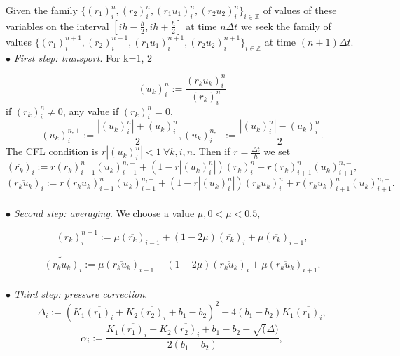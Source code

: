 \documentclass[a4paper,12pt]{article}
\begin{document}
Given the family $\{(r_1)_i^n,(r_2)_i^n,(r_1u_1)_i^n,(r_2u_2)_i^n\}_{i\in\mathbb{Z}}$ of values of these variables on the interval $[ih-\frac{h}{2},ih+\frac{h}{2}]$ at time $n\Delta t$ we seek the family   of values $\{(r_1)_i^{n+1},(r_2)_i^{n+1},(r_1u_1)_i^{n+1},(r_2u_2)_i^{n+1}\}_{i\in\mathbb{Z}}$ at time $(n+1)\Delta t$.\\



$\bullet$ \textit{First step: transport}. For k=1, 2
  
\begin{equation}(u_k)_i^n:=\frac{(r_ku_k)_i^n}{(r_k)_i^n} \end{equation}  if  $ (r_k)_i^n\not=0$, any value if  $(r_k)_i^n=0,$
\begin{equation} (u_k)_i^{n,+}:=\frac{|(u_k)_i^n|+(u_k)_i^n}{2},  (u_k)_i^{n,-}:=\frac{|(u_k)_i^n|-(u_k)_i^n}{2}.\end{equation} 
The CFL condition is $r|(u_k)_i^n|<1 \   \forall k,i,n$.
Then if  $r=\frac{\Delta t}{h}$ we set
\begin{equation} (\overline{r_k})_i:=r (r_k)_{i-1}^n(u_k)_{i-1}^{n,+}+(1 -r |(u_k)_i^n|) (r_k)_i^n  + r (r_k)_{i+1}^n(u_k)_{i+1}^{n,-},\end{equation} 
\begin{equation} (\overline{r_ku_k})_i:=r (r_ku_k)_{i-1}^n(u_k)_{i-1}^{n,+} +(1 -r |(u_k)_i^n|) (r_ku_k)_i^n   + r (r_ku_k)_{i+1}^n(u_k)_{i+1}^{n,-}.\end{equation}\\ 


 $\bullet$ \textit{Second step: averaging}. We choose a value $\mu, 0<\mu<0.5$,

\begin{equation} (r_k)_i^{n+1}:=\mu(\overline{r_k})_{i-1}+(1-2\mu)(\overline{r_k})_{i}+\mu(\overline{r_k})_{i+1},\end{equation}

\begin{equation}\widetilde{ (r_ku_k)}_i:=\mu(\overline{r_ku_k})_{i-1}+(1-2\mu)(\overline{r_ku_k})_{i}+\mu(\overline{r_ku_k})_{i+1}.\end{equation}\\


$\bullet$ \textit{Third step: pressure correction}. 
\begin{equation} \Delta_i:=(K_1\overline{ (r_1)_i}+K_2\overline{ (r_2)_i}+b_1-b_2)^2-4(b_1-b_2)K_1\overline{ (r_1)_i},\end{equation}
\begin{equation} \alpha_i:=\frac{K_1\overline{ (r_1)_i}+K_2\overline{ (r_2)_i}+b_1-b_2-\sqrt(\Delta)}{2(b_1-b_2)},\end{equation}
\end{document}
